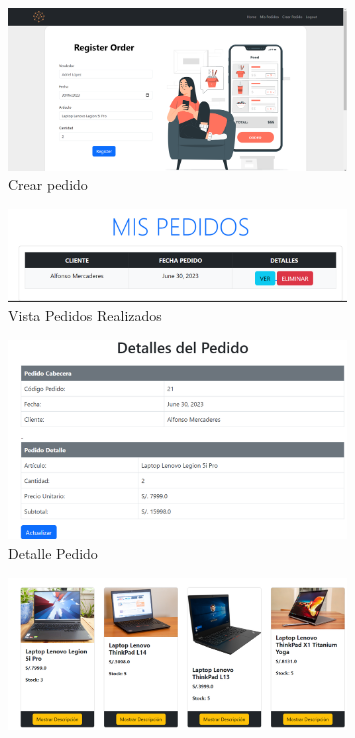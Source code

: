 \documentclass{article}
\begin{document}
\begin{itemize}
\begin{itemize}
  \begin{figure}[H]
		      \centering
                \includegraphics[width=0.8\textwidth,keepaspectratio]{img/orden1.png}
		      \caption{Crear pedido}
	   \end{figure}
  \begin{figure}[H]
		      \centering
                \includegraphics[width=0.8\textwidth,keepaspectratio]{img/det2.png}
		      \caption{Vista Pedidos Realizados}
	   \end{figure}
  \begin{figure}[H]
		      \centering
                \includegraphics[width=0.8\textwidth,keepaspectratio]{img/det1.png}
		      \caption{Detalle Pedido}
	   \end{figure}
  \begin{figure}[H]
		      \centering
                \includegraphics[width=0.8\textwidth,keepaspectratio]{img/lap2.png}

\end{figure}
\end{itemize}
\end{itemize}
\end{document}
